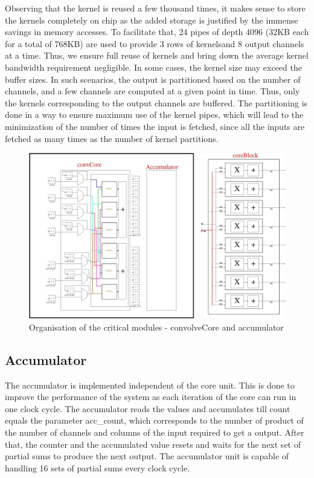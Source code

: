 \documentclass[a4paper,12pt, final]{report}
\begin{document}
Observing that the kernel is reused a few thousand times, it makes sense to store the kernels completely on chip as the added storage is justified by the immense savings in memory accesses. To facilitate that, 24 pipes of depth 4096 (32KB each for a total of 768KB) are used to provide 3 rows of kernelsand 8 output channels at a time. Thus, we ensure full reuse of kernels and bring down the average kernel bandwidth requirement negligible. In some cases, the kernel size may exceed the buffer sizes. In such scenarios, the output is partitioned based on the number of channels, and a few channels are computed at a given point in time. Thus, only the kernels corresponding to the output channels are buffered. The partitioning is done in a way to ensure maximum use of the kernel pipes, which will lead to the minimization of the number of times the input is fetched, since all the inputs are fetched as many times as the number of kernel partitions.
\\

\begin{figure}[h!]
    \centering
    \includegraphics[width=\textwidth]{Core.jpg}
    \caption{Organisation of the critical modules - convolveCore and accumulator}
    \label{fig:core}
\end{figure}

\subsection{Accumulator}

The accumulator is implemented independent of the core unit. This is done to improve the performance of the system as each iteration of the core can run in one clock cycle. The accumulator reads the values and accumulates till count equals the parameter acc\_count, which corresponds to the number of product of the number of channels and columns of the input required to get a output. After that, the counter and the accumulated value resets and waits for the next set of partial sums to produce the next output. The accumulator unit is capable of handling 16 sets of partial sums every clock cycle.
\\
\end{document}
